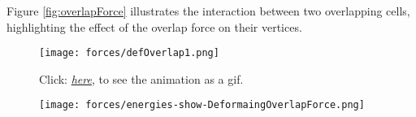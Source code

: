 Figure \ref{fig:overlapForce} illustrates the interaction between two overlapping cells, highlighting the effect of the overlap force on their vertices.
\begin{figure}[h!]
	\begin{center}
		\texttt{[image: forces/defOverlap1.png]}
			\caption{Click: \href{https://github.com/tivo476c/FlexibleCellModel/blob/master/figures/gifs/showForces/show-DeformaingOverlapForce.gif}{\textit{here}}, to see the animation as a gif.
			}
			\label{fig:deformingOverlapForce}
	\end{center}
\end{figure}

\begin{figure}
	\begin{center}
		\texttt{[image: forces/energies-show-DeformaingOverlapForce.png]}
		\caption{}
		\label{fig:deformingOverlapEnergy}
	\end{center}
\end{figure}

